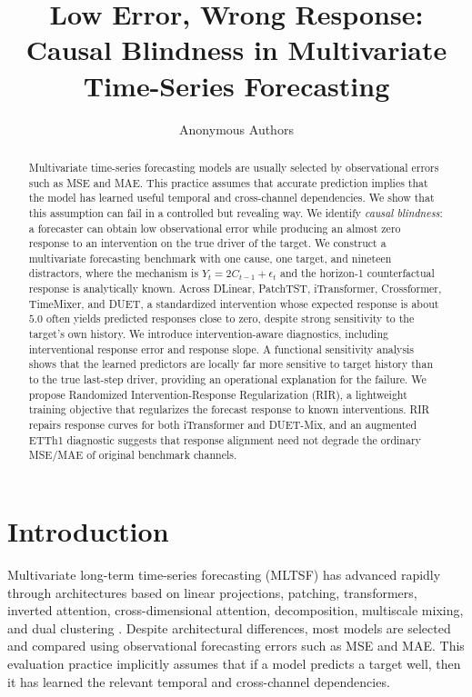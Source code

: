 \documentclass{article}
\title{
Low Error, Wrong Response: \\
Causal Blindness in Multivariate Time-Series Forecasting
}
\author{
Anonymous Authors
}
\newcommand{\rir}{Randomized Intervention-Response Regularization}
\begin{document}
\maketitle

\begin{abstract}
Multivariate time-series forecasting models are usually selected by observational
errors such as MSE and MAE. This practice assumes that accurate prediction implies
that the model has learned useful temporal and cross-channel dependencies. We show
that this assumption can fail in a controlled but revealing way. We identify
\emph{causal blindness}: a forecaster can obtain low observational error while
producing an almost zero response to an intervention on the true driver of the
target. We construct a multivariate forecasting benchmark with one cause, one target,
and nineteen distractors, where the mechanism is $Y_t = 2C_{t-1}+\epsilon_t$ and the
horizon-1 counterfactual response is analytically known. Across DLinear, PatchTST,
iTransformer, Crossformer, TimeMixer, and DUET, a standardized intervention whose
expected response is about $5.0$ often yields predicted responses close to zero,
despite strong sensitivity to the target's own history. We introduce
intervention-aware diagnostics, including interventional response error and response
slope. A functional sensitivity analysis shows that the learned predictors are
locally far more sensitive to target history than to the true last-step driver,
providing an operational explanation for the failure. We propose \rir{} (RIR), a
lightweight training objective that regularizes the forecast response to known
interventions. RIR repairs response curves for both iTransformer and DUET-Mix, and
an augmented ETTh1 diagnostic suggests that response alignment need not degrade the
ordinary MSE/MAE of original benchmark channels.
\end{abstract}

\section{Introduction}

Multivariate long-term time-series forecasting (MLTSF) has advanced rapidly through
architectures based on linear projections, patching, transformers, inverted
attention, cross-dimensional attention, decomposition, multiscale mixing, and
dual clustering
\citep{zeng2023transformers,nie2023patchtst,liu2024itransformer,zhang2023crossformer,wang2024timemixer,qiu2025duet}.
Despite architectural differences, most models are selected and compared using
observational forecasting errors such as MSE and MAE. This evaluation practice
implicitly assumes that if a model predicts a target well, then it has learned the
relevant temporal and cross-channel dependencies.
\end{document}
